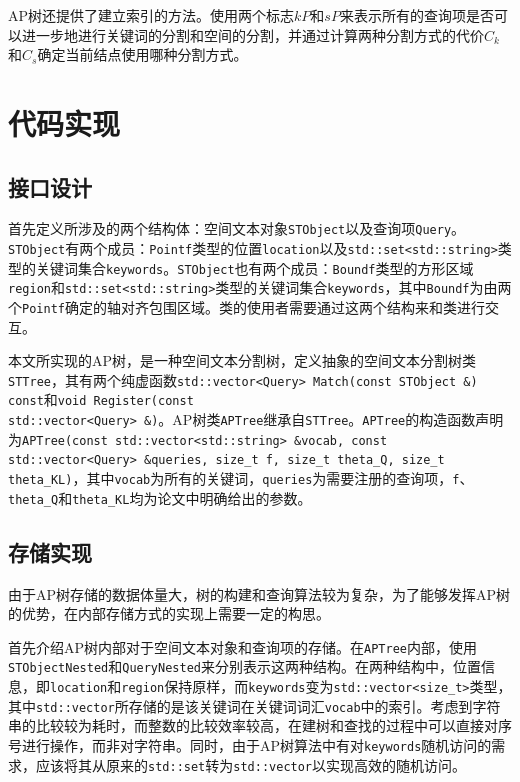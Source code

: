 \documentclass[UTF8]{ctexart}
\begin{document}
AP树还提供了建立索引的方法。使用两个标志$kP$和$sP$来表示所有的查询项是否可以进一步地进行关键词的分割和空间的分割，并通过计算两种分割方式的代价$C_k$和$C_s$确定当前结点使用哪种分割方式。


\section{代码实现}

\subsection{接口设计}
首先定义所涉及的两个结构体：空间文本对象\texttt{STObject}以及查询项\texttt{Query}。\texttt{STObject}有两个成员：\texttt{Pointf}类型的位置\texttt{location}以及\texttt{std::set<std::string>}类型的关键词集合\texttt{keywords}。\texttt{STObject}也有两个成员：\texttt{Boundf}类型的方形区域\texttt{region}和\texttt{std::set<std::string>}类型的关键词集合\texttt{keywords}，其中\texttt{Boundf}为由两个\texttt{Pointf}确定的轴对齐包围区域。类的使用者需要通过这两个结构来和类进行交互。

本文所实现的AP树，是一种空间文本分割树，定义抽象的空间文本分割树类\texttt{STTree}，其有两个纯虚函数\texttt{std::vector<Query> Match(const STObject \&) const}和\texttt{void Register(const \\std::vector<Query> \&)}。AP树类\texttt{APTree}继承自\texttt{STTree}。\texttt{APTree}的构造函数声明为\texttt{APTree(const std::vector<std::string> \&vocab, const std::vector<Query> \&queries, size\_t f, size\_t theta\_Q, size\_t theta\_KL)}，其中\texttt{vocab}为所有的关键词，\texttt{queries}为需要注册的查询项，\texttt{f}、\texttt{theta\_Q}和\texttt{theta\_KL}均为论文中明确给出的参数。

\subsection{存储实现}
由于AP树存储的数据体量大，树的构建和查询算法较为复杂，为了能够发挥AP树的优势，在内部存储方式的实现上需要一定的构思。

首先介绍AP树内部对于空间文本对象和查询项的存储。在\texttt{APTree}内部，使用\texttt{STObjectNested}和\texttt{QueryNested}来分别表示这两种结构。在两种结构中，位置信息，即\texttt{location}和\texttt{region}保持原样，而\texttt{keywords}变为\texttt{std::vector<size\_t>}类型，其中\texttt{std::vector}所存储的是该关键词在关键词词汇\texttt{vocab}中的索引。考虑到字符串的比较较为耗时，而整数的比较效率较高，在建树和查找的过程中可以直接对序号进行操作，而非对字符串。同时，由于AP树算法中有对\texttt{keywords}随机访问的需求，应该将其从原来的\texttt{std::set}转为\texttt{std::vector}以实现高效的随机访问。
\end{document}
